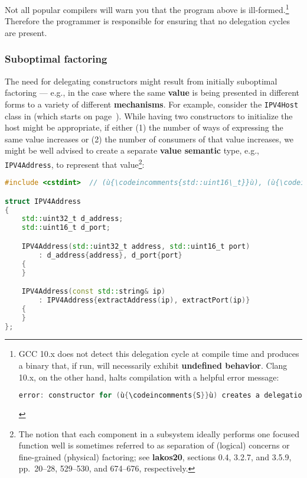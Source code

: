 \noindent Not all popular compilers will warn you that the program above is
ill-formed.{\cprotect\footnote{GCC 10.x does not detect this delegation
cycle at compile time and produces a binary that, if run, will
necessarily exhibit \textbf{undefined behavior}. Clang 10.x, on the
other hand, halts compilation with a helpful error message:

\begin{lstlisting}[language=C++, basicstyle={\ttfamily\footnotesize}]
error: constructor for (ù{\codeincomments{S}}ù) creates a delegation cycle
\end{lstlisting}\vspace*{-1ex}
      }} Therefore the programmer is responsible for ensuring that
no delegation cycles are present.

\subsubsection[Suboptimal factoring]{Suboptimal factoring}\label{suboptimal-factoring}

The need for delegating constructors might result from initially
suboptimal factoring --- e.g., in the case where the same \textbf{value}
is being presented in different forms to a variety of different
\textbf{mechanisms}. For example, consider the \texttt{IPV4Host} class
in {\it{}} (which starts on page~\pageref{ctordelegating-use-cases}). While having two constructors to
initialize the host might be appropriate, if either (1) the number of
ways of expressing the same value increases or (2) the number of
consumers of that value increases, we might be well advised to create a
separate \textbf{value semantic} type, e.g., \texttt{IPV4Address}, to
represent that value{\cprotect\footnote{The notion that each component
in a subsystem ideally performs one focused function well is sometimes
referred to as separation of (logical) concerns or
  fine-grained (physical) factoring; see \textbf{{lakos20}},
  sections 0.4, 3.2.7, and 3.5.9, pp.~20--28, 529--530, and 674--676,
  respectively.}}:

\begin{lstlisting}[language=C++]
#include <cstdint>  // (ù{\codeincomments{std::uint16\_t}}ù), (ù{\codeincomments{std::uint32\_t}}ù)

struct IPV4Address
{
    std::uint32_t d_address;
    std::uint16_t d_port;

    IPV4Address(std::uint32_t address, std::uint16_t port)
        : d_address{address}, d_port{port}
    {
    }

    IPV4Address(const std::string& ip)
        : IPV4Address{extractAddress(ip), extractPort(ip)}
    {
    }
};
\end{lstlisting}
    
